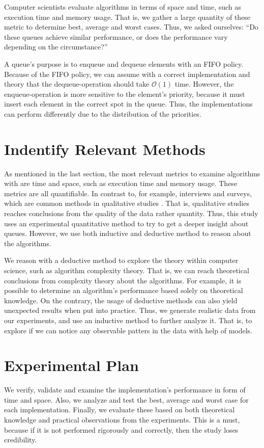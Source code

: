 \documentclass[a4paper,11pt]{kth-mag}
\newcommand*{\skippara}{\par\vspace{\baselineskip} \noindent}
\begin{document}
\skippara Computer scientists evaluate algorithms in terms of space and time, such as execution time and memory usage.
That is, we gather a large quantity of these metric to determine best, average and worst cases.
Thus, we asked ourselves: ``Do these queues achieve similar performance, or does the performance vary depending on the circumstance?''

\skippara A queue's purpose is to enqueue and dequeue elements with an FIFO policy.
Because of the FIFO policy, we can assume with a correct implementation and theory that the dequeue-operation should take $\mathcal{O}(1)$ time.
However, the enqueue-operation is more sensitive to the element's priority, because it must insert each element in the correct spot in the queue.
Thus, the implementations can perform differently due to the distribution of the priorities.

\section{Indentify Relevant Methods}\label{sec:methods}
As mentioned in the last section, the most relevant metrics to examine algorithms with are time and space, such as execution time and memory usage.
These metrics are all quantifiable.
In contrast to, for example, interviews and surveys, which are common methods in qualitative studies \cite{Omexperi69:online, haakansson2013portal}.
That is, qualitative studies reaches conclusions from the quality of the data rather quantity.
Thus, this study uses an experimental quantitative method to try to get a deeper insight about queues.
However, we use both inductive and deductive method to reason about the algorithms.

\skippara We reason with a deductive method to explore the theory within computer science, such as algorithm complexity theory.
That is, we can reach theoretical conclusions from complexity theory about the algorithms.
For example, it is possible to determine an algorithm's performance based solely on theoretical knowledge.
On the contrary, the usage of deductive methods can also yield unexpected results when put into practice.
Thus, we generate realistic data from our experiments, and use an inductive method to further analyze it.
That is, to explore if we can notice any observable patters in the data with help of models.

\section{Experimental Plan}\label{sec:plan}
We verify, validate and examine the implementation's performance in form of time and space.
Also, we analyze and test the best, average and worst case for each implementation.
Finally, we evaluate these based on both theoretical knowledge and practical observations from the experiments.
This is a must, because if it is not performed rigorously and correctly, then the study loses credibility.
\end{document}
